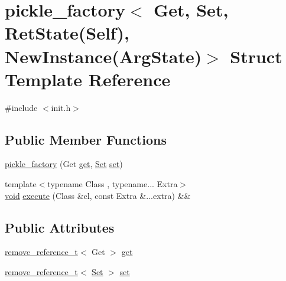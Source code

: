\hypertarget{structpickle__factory_3_01_get_00_01_set_00_01_ret_state_07_self_08_00_01_new_instance_07_arg_state_08_4}{}\section{pickle\+\_\+factory$<$ Get, Set, Ret\+State(Self), New\+Instance(Arg\+State)$>$ Struct Template Reference}
\label{structpickle__factory_3_01_get_00_01_set_00_01_ret_state_07_self_08_00_01_new_instance_07_arg_state_08_4}


{\ttfamily \#include $<$init.\+h$>$}

\subsection*{Public Member Functions}
\begin{DoxyCompactItemize}
\item 
\mbox{\hyperlink{structpickle__factory_3_01_get_00_01_set_00_01_ret_state_07_self_08_00_01_new_instance_07_arg_state_08_4_a4e32bc9bb6b20b126a70e2714cdf95ce}{pickle\+\_\+factory}} (Get \mbox{\hyperlink{structpickle__factory_3_01_get_00_01_set_00_01_ret_state_07_self_08_00_01_new_instance_07_arg_state_08_4_a23424db78247af91a611fd9780590768}{get}}, \mbox{\hyperlink{_python-ast_8h_a8b39bad9fda6bc73af75e4d6085bcf91}{Set}} \mbox{\hyperlink{classset}{set}})
\item 
{\footnotesize template$<$typename Class , typename... Extra$>$ }\\\mbox{\hyperlink{_s_d_l__opengles2__gl2ext_8h_ae5d8fa23ad07c48bb609509eae494c95}{void}} \mbox{\hyperlink{structpickle__factory_3_01_get_00_01_set_00_01_ret_state_07_self_08_00_01_new_instance_07_arg_state_08_4_a29156bf29134dfe90eada70cd350265d}{execute}} (Class \&cl, const Extra \&...extra) \&\&
\end{DoxyCompactItemize}
\subsection*{Public Attributes}
\begin{DoxyCompactItemize}
\item 
\mbox{\hyperlink{detail_2common_8h_a3a08cea569e6926ac8d7d74dd7178b5f}{remove\+\_\+reference\+\_\+t}}$<$ Get $>$ \mbox{\hyperlink{structpickle__factory_3_01_get_00_01_set_00_01_ret_state_07_self_08_00_01_new_instance_07_arg_state_08_4_a23424db78247af91a611fd9780590768}{get}}
\item 
\mbox{\hyperlink{detail_2common_8h_a3a08cea569e6926ac8d7d74dd7178b5f}{remove\+\_\+reference\+\_\+t}}$<$ \mbox{\hyperlink{_python-ast_8h_a8b39bad9fda6bc73af75e4d6085bcf91}{Set}} $>$ \mbox{\hyperlink{structpickle__factory_3_01_get_00_01_set_00_01_ret_state_07_self_08_00_01_new_instance_07_arg_state_08_4_a34878fc57eb8c8e44d430aec5e439e64}{set}}
\end{DoxyCompactItemize}


